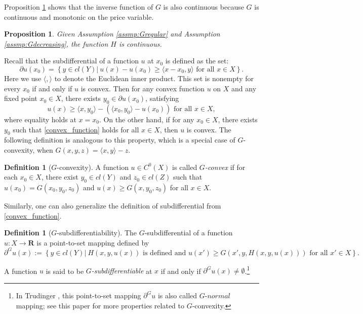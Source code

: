 \documentclass[a4paper, 11pt]{amsart}
\numberwithin{equation}{section}
\theoremstyle{plain}
\newtheorem{proposition}[theorem]{Proposition}
\theoremstyle{definition}
\newtheorem{definition}[theorem]{Definition}
\theoremstyle{remark}
\newcommand{\R}{\mathbf{R}}
\begin{document}
 Proposition \ref{lemma_continuity} shows that the inverse function of $G$ is also continuous because $G$ is continuous and monotonic on the price variable. \medskip
 
 \begin{proposition}\label{lemma_continuity}
 	Given Assumption \ref{assmp:Gregular} and Assumption \ref{assmp:Gdecreasing}, the function $H$ is continuous.
 \end{proposition}

{Recall that the subdifferential of a function $u$ at $x_0$ is defined as the set:
	\begin{equation*}
	\partial u(x_0) = \left\{ y \in cl(Y)|~ u(x) - u(x_0) \ge \langle  x- x_0,  y \rangle \text{ for all } x \in X  \right\}.
	\end{equation*}
	Here we use $ \langle , \rangle$ to denote the Euclidean inner product. This set is nonempty for every $x_0$ if and only if $u$ is convex.} Then for any convex function $u$ on $X$ and any fixed point $x_0 \in X$, there exists $y_0 \in \partial u(x_0)$, satisfying%
\begin{equation}\label{convex_function}
u(x) \ge  \langle x , y_0\rangle -\left(\langle x_0, y_0\rangle -  u(x_0)\right)	\text{  for all $x \in X$},
\end{equation} 
where equality holds at $x = x_0$. On the other hand, if for any $x_0\in X$, there exists $y_0$ such that \eqref{convex_function} holds for all $x\in X$, then $u$ is convex. The following definition is analogous to this property, which is a special case of $G$-convexity, when $G(x,y,z) = \langle x, y \rangle -z$.

\begin{definition}[$G$-convexity]
	A function $u\in C^0(X)$ is called {\it $G$-convex} if for each $x_0 \in X$, there exist $y_0 \in   cl(Y)$ and $z_0 \in  cl(Z)$ such that $u(x_0)=G(x_0, y_0, z_0)$ and $u(x)\ge G(x, y_0, z_0)$ for all $x\in X$.
\end{definition}


Similarly, one can also generalize the definition of subdifferential from \eqref{convex_function}.

\begin{definition}[$G$-subdifferentiability]
	The $G$-subdifferential of a 
	function $u: X \rightarrow \R$ is a point-to-set mapping defined by
	\begin{equation*}
	\partial^G u(x):= \left\{ y\in  cl(Y)|~ H(x,y,u(x)) \text{ is defined and }u(x')\ge G(x',y, H(x,y,u(x))) \text{ for all } x'\in X \right\}.
	\end{equation*}
	
	A function $u$ is said to be {\it $G$-subdifferentiable} at $x$ if and only if $\partial^G u(x) \neq \emptyset$.\footnote{In Trudinger \cite{Trudinger14}, this point-to-set mapping $\partial^G u$ is also called $G$-$normal$ mapping; see this paper for more properties related to $G$-convexity.}
\end{definition}
\end{document}
